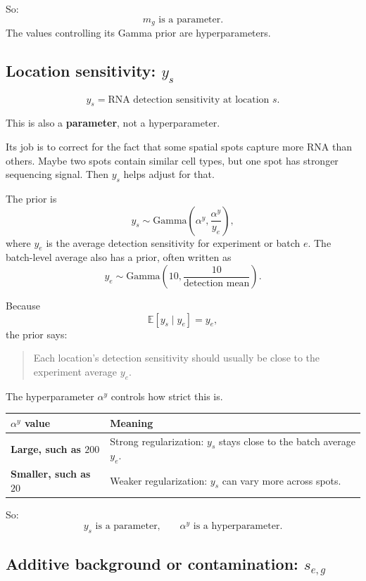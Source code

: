 \documentclass[11pt]{article}
\newcommand{\E}{\mathbb{E}}
\newcommand{\term}[1]{\textbf{#1}}
\begin{document}
So:
\[
m_g\text{ is a parameter.}
\]
The values controlling its Gamma prior are hyperparameters.

\subsection{Location sensitivity: $y_s$}

\[
y_s=\text{RNA detection sensitivity at location }s.
\]

This is also a \term{parameter}, not a hyperparameter.

Its job is to correct for the fact that some spatial spots capture more RNA than others. Maybe two spots contain similar cell types, but one spot has stronger sequencing signal. Then $y_s$ helps adjust for that.

The prior is
\[
y_s\sim \mathrm{Gamma}\left(\alpha^y,\frac{\alpha^y}{y_e}\right),
\]
where $y_e$ is the average detection sensitivity for experiment or batch $e$. The batch-level average also has a prior, often written as
\[
y_e\sim \mathrm{Gamma}\left(10,\frac{10}{\text{detection mean}}\right).
\]

Because
\[
\E[y_s\mid y_e]=y_e,
\]
the prior says:

\begin{quote}
Each location's detection sensitivity should usually be close to the experiment average $y_e$.
\end{quote}

The hyperparameter $\alpha^y$ controls how strict this is.

\begin{center}
\begin{tabularx}{0.95\textwidth}{>{\bfseries}p{}X}
\toprule
$\alpha^y$ value & Meaning \\
\midrule
Large, such as $200$ & Strong regularization: $y_s$ stays close to the batch average $y_e$. \\
Smaller, such as $20$ & Weaker regularization: $y_s$ can vary more across spots. \\
\bottomrule
\end{tabularx}
\end{center}

So:
\[
y_s\text{ is a parameter,}
\qquad
\alpha^y\text{ is a hyperparameter.}
\]

\subsection{Additive background or contamination: $s_{e,g}$}
\end{document}
